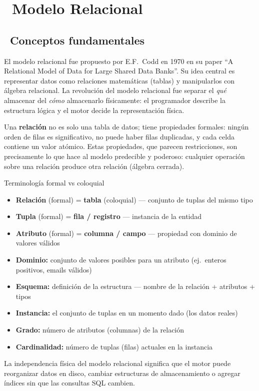 \chapter[Modelo Relacional]{~Modelo Relacional}

\section[Conceptos fundamentales]{~Conceptos fundamentales}

El modelo relacional fue propuesto por E.F.~Codd en 1970 en su paper ``A Relational Model of Data for Large Shared Data Banks''.
Su idea central es representar datos como relaciones matemáticas (tablas) y manipularlos con álgebra relacional.
La revolución del modelo relacional fue separar el \emph{qué} almacenar del \emph{cómo} almacenarlo físicamente: el programador describe la estructura lógica y el motor decide la representación física.

Una \textbf{relación} no es solo una tabla de datos; tiene propiedades formales: ningún orden de filas es significativo, no puede haber filas duplicadas, y cada celda contiene un valor atómico.
Estas propiedades, que parecen restricciones, son precisamente lo que hace al modelo predecible y poderoso: cualquier operación sobre una relación produce otra relación (álgebra cerrada).

\begin{teoriabox}{Terminología formal vs coloquial}
\begin{itemize}
  \item \textbf{Relación} (formal) = \textbf{tabla} (coloquial) — conjunto de tuplas del mismo tipo
  \item \textbf{Tupla} (formal) = \textbf{fila / registro} — instancia de la entidad
  \item \textbf{Atributo} (formal) = \textbf{columna / campo} — propiedad con dominio de valores válidos
  \item \textbf{Dominio:} conjunto de valores posibles para un atributo (ej.~enteros positivos, emails válidos)
  \item \textbf{Esquema:} definición de la estructura — nombre de la relación + atributos + tipos
  \item \textbf{Instancia:} el conjunto de tuplas en un momento dado (los datos reales)
  \item \textbf{Grado:} número de atributos (columnas) de la relación
  \item \textbf{Cardinalidad:} número de tuplas (filas) actuales en la instancia
\end{itemize}
La independencia física del modelo relacional significa que el motor puede reorganizar datos en disco, cambiar estructuras de almacenamiento o agregar índices sin que las consultas SQL cambien.
\end{teoriabox}

